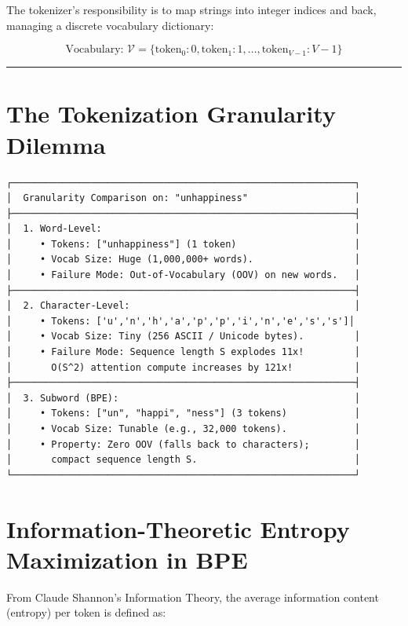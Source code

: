 \documentclass[
  letterpaper,
]{scrbook}
\begin{document}
The tokenizer's responsibility is to map strings into integer indices
and back, managing a discrete vocabulary dictionary:

\[\text{Vocabulary: } \mathcal{V} = \{ \text{token}_0: 0, \text{token}_1: 1, \dots, \text{token}_{V-1}: V-1 \}\]

\begin{center}\rule{0.5\linewidth}{0.5pt}\end{center}

\section{The Tokenization Granularity
Dilemma}\label{the-tokenization-granularity-dilemma}

\begin{verbatim}
┌─────────────────────────────────────────────────────────────┐
│  Granularity Comparison on: "unhappiness"                   │
├─────────────────────────────────────────────────────────────┤
│  1. Word-Level:                                             │
│     • Tokens: ["unhappiness"] (1 token)                     │
│     • Vocab Size: Huge (1,000,000+ words).                  │
│     • Failure Mode: Out-of-Vocabulary (OOV) on new words.   │
├─────────────────────────────────────────────────────────────┤
│  2. Character-Level:                                        │
│     • Tokens: ['u','n','h','a','p','p','i','n','e','s','s']│
│     • Vocab Size: Tiny (256 ASCII / Unicode bytes).         │
│     • Failure Mode: Sequence length S explodes 11x!         │
│       O(S^2) attention compute increases by 121x!           │
├─────────────────────────────────────────────────────────────┤
│  3. Subword (BPE):                                          │
│     • Tokens: ["un", "happi", "ness"] (3 tokens)            │
│     • Vocab Size: Tunable (e.g., 32,000 tokens).            │
│     • Property: Zero OOV (falls back to characters);        │
│       compact sequence length S.                            │
└─────────────────────────────────────────────────────────────┘
\end{verbatim}

\section{Information-Theoretic Entropy Maximization in
BPE}\label{information-theoretic-entropy-maximization-in-bpe}

From Claude Shannon's Information Theory, the average information
content (entropy) per token is defined as:
\end{document}
